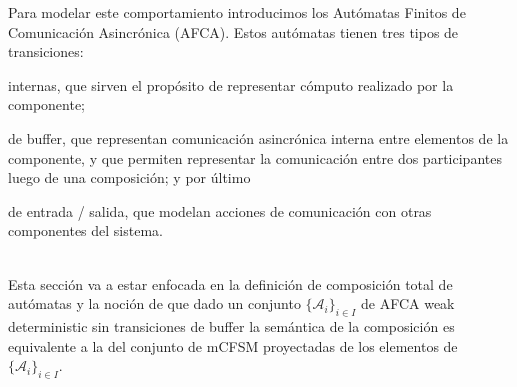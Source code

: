 Para modelar este comportamiento introducimos los Autómatas Finitos de Comunicación Asincrónica (AFCA). Estos autómatas tienen tres tipos de transiciones: 
\begin{inparaenum}[1)]
\item internas, que sirven el propósito de representar cómputo realizado por la componente; 
\item de buffer, que representan comunicación asincrónica interna entre elementos de la componente, y que permiten representar la comunicación entre dos participantes luego de una composición; y por último 
\item de entrada / salida, que modelan acciones de comunicación con otras componentes del sistema.
\end{inparaenum} \\
Esta sección va a estar enfocada en la definición de composición total de autómatas y la noción de que dado un conjunto $\{ \mathcal{A}_i\}_{i \in I}$ de AFCA weak deterministic sin transiciones de buffer la semántica de la composición es equivalente a la del conjunto de mCFSM proyectadas de los elementos de $\{ \mathcal{A}_i\}_{i \in I}$. 

\centering
{}     


